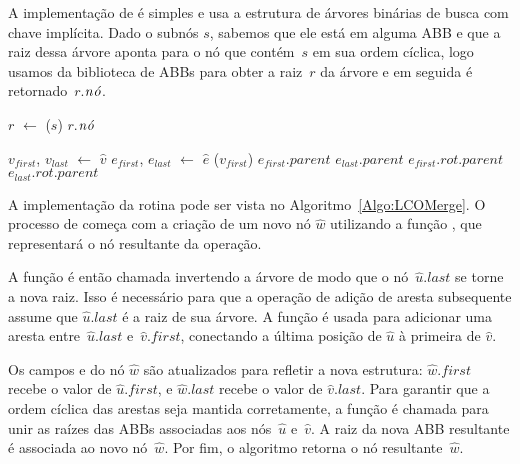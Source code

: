 A implementação de \LCOFindNode{} é simples e usa a estrutura de árvores binárias de busca com chave implícita.
Dado o subnós $s$, sabemos que ele está em alguma ABB e que a raiz dessa árvore aponta para o nó que contém~$s$ em sua ordem cíclica, logo usamos \treapGetRoot{} da biblioteca de ABBs para obter a raiz~$r$ da árvore e em seguida é retornado~$r$.$\mathit{n\acute{o}}$.

\begin{algorithm}[htb]
\caption{\LCOFindNode($s$)}
\label{Algo:LCOFindNode}
\begin{algorithmic}[1]
\State $r$ $\gets$ \treapGetRoot($s$)
\State \Return $r$.$\mathit{n\acute{o}}$
\end{algorithmic}
\end{algorithm}




\begin{algorithm}[htb]
\caption{\LCOFindSubNode($\hat v$, $\hat e$)}
\label{Algo:LCOFindSubNode}
\begin{algorithmic}[1]
\State $v_{first}$, $v_{last}$ $\gets$ $\hat v$
\State $e_{first}$, $e_{last}$ $\gets$ $\hat e$
\State \linkcutEvert($v_{first}$)
\State \Return $e_{first}$.$parent$
\EndIf
\State \Return $e_{last}$.$parent$
\Else
{}
\State \Return $e_{first}.rot.parent$
\Else
\State \Return $e_{last}.rot.parent$
\EndIf
\EndIf
\end{algorithmic}
\end{algorithm}


A implementação da rotina \LCOMerge pode ser vista no Algoritmo~\ref{Algo:LCOMerge}.
O processo de \LCOMerge{} começa com a criação de um novo nó $\hat w$ utilizando a função \LCOMakeNode, que representará o nó resultante da operação.

A função \linkcutEvert{} é então chamada invertendo a árvore de modo que o nó~$\hat u$.$last$ se torne a nova raiz.
Isso é necessário para que a operação \linkcutAddEdge de adição de aresta subsequente assume que $\hat u$.$last$ é a raiz de sua árvore.
A função \linkcutAddEdge é usada para adicionar uma aresta entre~$\hat u$.$last$ e~$\hat v$.$first$, conectando a última posição de $\hat u$ à primeira de $\hat v$.

Os campos  e  do nó $\hat w$ são atualizados para refletir a nova estrutura: $\hat w$.$first$ recebe o valor de $\hat u$.$first$, e $\hat w$.$last$ recebe o valor de $\hat v$.$last$. Para garantir que a ordem cíclica das arestas seja mantida corretamente, a função \treapJoin{} é chamada para unir as raízes das ABBs associadas aos nós~$\hat u$ e~$\hat v$. A raiz da nova ABB resultante é associada ao novo nó~$\hat w$.
Por fim, o algoritmo retorna o nó resultante~$\hat w$.


